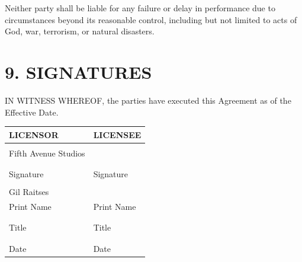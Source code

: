\documentclass[
  11pt,
]{article}
\begin{document}
Neither party shall be liable for any failure or delay in performance
due to circumstances beyond its reasonable control, including but not
limited to acts of God, war, terrorism, or natural disasters.

\hypertarget{signatures}{%
\section{9. SIGNATURES}\label{signatures}}

IN WITNESS WHEREOF, the parties have executed this Agreement as of the
Effective Date.

\vspace{1cm}

\begin{table}[h]
\centering
\begin{tabular}{p{}p{}}
\hline
\textbf{LICENSOR} & \textbf{LICENSEE} \\
\hline
\vspace{2cm} & \vspace{2cm} \\
Fifth Avenue Studios & \underline{\hspace{5cm}} \\
\hline
\vspace{1cm} & \vspace{1cm} \\
\underline{\hspace{5cm}} & \underline{\hspace{5cm}} \\
Signature & Signature \\
\hline
\vspace{0.5cm} & \vspace{0.5cm} \\
Gil Raitses & \underline{\hspace{5cm}} \\
Print Name & Print Name \\
\hline
\vspace{0.5cm} & \vspace{0.5cm} \\
\underline{\hspace{5cm}} & \underline{\hspace{5cm}} \\
Title & Title \\
\hline
\vspace{0.5cm} & \vspace{0.5cm} \\
\underline{\hspace{5cm}} & \underline{\hspace{5cm}} \\
Date & Date \\
\hline
\end{tabular}
\end{table}
\end{document}
